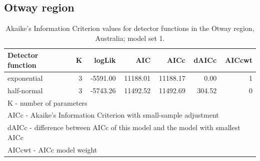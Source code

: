 \documentclass[]{elsarticle} %
\begin{document}
\newpage

\hypertarget{otway-region-2}{%
\subsection{Otway region}\label{otway-region-2}}

\begingroup\fontsize{10}{12}\selectfont

\begin{longtable}[t]{lrrrrrr}
\caption{\label{tab:density-aic-o-1}Akaike's Information Criterion values for detector functions in the Otway region, Australia; model set 1.}\\
\toprule
Detector function & K & logLik & AIC & AICc & dAICc & AICcwt\\
\midrule
exponential & 3 & -5591.00 & 11188.01 & 11188.17 & 0.00 & 1\\
half-normal & 3 & -5743.26 & 11492.52 & 11492.69 & 304.52 & 0\\
\bottomrule
\multicolumn{7}{l}{\rule{0pt}{1em}K - number of parameters}\\
\multicolumn{7}{l}{\rule{0pt}{1em}AICc - Akaike's Information Criterion with small-sample adjustment}\\
\multicolumn{7}{l}{\rule{0pt}{1em}dAICc - difference between AICc of this model and the model with smallest AICc}\\
\multicolumn{7}{l}{\rule{0pt}{1em}AICcwt - AICc model weight}\\
\end{longtable}
\endgroup{}

\newpage

\begingroup\fontsize{10}{12}\selectfont
\end{document}
